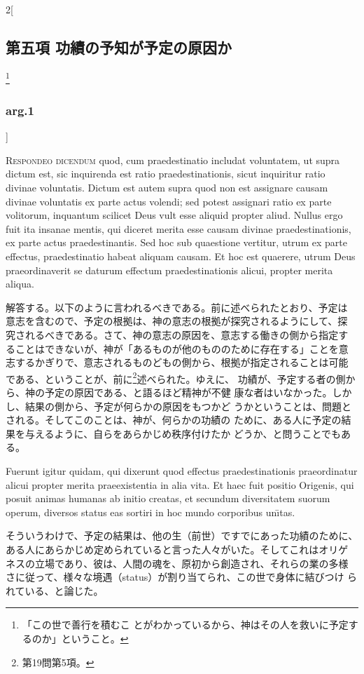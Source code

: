 \documentclass[paper=a4paper,fontsize=10pt,jafontsize=9pt,titlepage]{jlreq}
\begin{document}
\begin{paracol}{2}[\subsection{第五項 功績の予知が予定の原因か}\footnote{「この世で善行を積むこ とがわかっているから、神はその人を救いに予定するのか」ということ。}\subsubsection{arg.1}]


{\scshape Respondeo dicendum} quod, cum praedestinatio
includat voluntatem, ut supra dictum est, sic inquirenda est ratio
praedestinationis, sicut inquiritur ratio divinae voluntatis. Dictum est
autem supra quod non est assignare causam divinae voluntatis ex parte
actus volendi; sed potest assignari ratio ex parte volitorum, inquantum
scilicet Deus vult esse aliquid propter aliud. Nullus ergo fuit ita
insanae mentis, qui diceret merita esse causam divinae
praedestinationis, ex parte actus praedestinantis. Sed hoc sub
quaestione vertitur, utrum ex parte effectus, praedestinatio habeat
aliquam causam. Et hoc est quaerere, utrum Deus praeordinaverit se
daturum effectum praedestinationis alicui, propter merita
aliqua.


\switchcolumn


解答する。以下のように言われるべきである。前に述べられたとおり、予定は
意志を含むので、予定の根拠は、神の意志の根拠が探究されるようにして、探
究されるべきである。さて、神の意志の原因を、意志する働きの側から指定す
ることはできないが、神が「あるものが他のもののために存在する」ことを意
志するかぎりで、意志されるものどもの側から、根拠が指定されることは可能
である、ということが、前に\footnote{第19問第5項。}述べられた。ゆえに、
功績が、予定する者の側から、神の予定の原因である、と語るほど精神が不健
康な者はいなかった。しかし、結果の側から、予定が何らかの原因をもつかど
うかということは、問題とされる。そしてこのことは、神が、何らかの功績の
ために、ある人に予定の結果を与えるように、自らをあらかじめ秩序付けたか
どうか、と問うことでもある。


\switchcolumn*


Fuerunt igitur quidam, qui dixerunt quod effectus
praedestinationis praeordinatur alicui propter merita praeexistentia in
alia vita. Et haec fuit positio Origenis, qui posuit animas humanas ab
initio creatas, et secundum diversitatem suorum operum, diversos status
eas sortiri in hoc mundo corporibus un\={\i}tas.


\switchcolumn


そういうわけで、予定の結果は、他の生（前世）ですでにあった功績のために、
ある人にあらかじめ定められていると言った人々がいた。そしてこれはオリゲ
ネスの立場であり、彼は、人間の魂を、原初から創造され、それらの業の多様
さに従って、様々な境遇（status）が割り当てられ、この世で身体に結びつけ
られている、と論じた。



\end{paracol}
\end{document}
